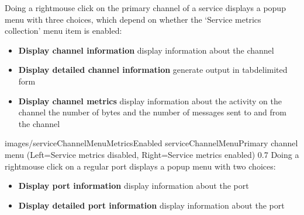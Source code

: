 Doing a right\longDash{}mouse click on the primary channel of a service displays a popup
menu with three choices, which depend on whether the `Service metrics collection' menu
item is enabled:
\begin{itemize}
\item\textbf{Display channel information} display information about the channel
\item\exSp\textbf{Display detailed channel information} generate output in
tab\longDash{}delimited form
\item\exSp\textbf{Display channel metrics} display information about the activity on the
channel \longDash{} the number of bytes and the number of messages sent to and from the
channel
\end{itemize}
%
{images/serviceChannelMenuMetricsEnabled}%
{serviceChannelMenu}{Primary channel menu (Left=Service metrics disabled, Right=Service
metrics enabled)}%
{0.7}
\clearpage
Doing a right\longDash{}mouse click on a regular port displays a popup menu with two
choices:
\begin{itemize}
\item\textbf{Display port information} display information about the port
\item\exSp\textbf{Display detailed port information} display information about the port
\end{itemize}

